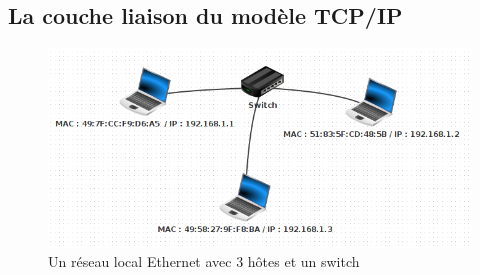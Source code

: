 \documentclass[
  11pt,
]{article}
\begin{document}
\hypertarget{la-couche-liaison-du-moduxe8le-tcpip}{%
\subsection{La couche liaison du modèle
TCP/IP}\label{la-couche-liaison-du-moduxe8le-tcpip}}

\begin{figure}
\centering
\includegraphics{images/lan2.png}
\caption{Un réseau local Ethernet avec 3 hôtes et un switch}
\end{figure}
\end{document}

